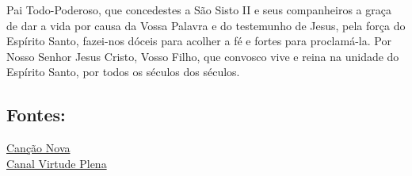 \documentclass[a4paper,12pt]{extarticle} \usepackage[utf8]{inputenc}
\begin{document}
Pai Todo-Poderoso, que concedestes a São Sisto II e seus companheiros a graça de dar a vida por causa da Vossa Palavra e do testemunho de Jesus,  
pela força do Espírito Santo, fazei-nos dóceis para acolher a fé e fortes para proclamá-la.  
Por Nosso Senhor Jesus Cristo, Vosso Filho, que convosco vive e reina na unidade do Espírito Santo,  
por todos os séculos dos séculos.  





\vfill

\begin{center}
\subsection*{Fontes:}
\href{https://santo.cancaonova.com/santo/sao-sisto-ii-papa-e-seus-companheiros-diaconos/}{Canção Nova}\\ 
\href{https://www.youtube.com/watch?v=sgsIK4bPKgE&list=PLRL6i6PPLb5-3ktc9DIPs50VmSLCTu0ok}{Canal Virtude Plena}
\end{center}
\end{document}

